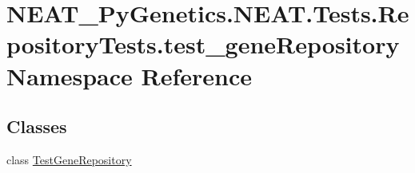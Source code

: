 \hypertarget{namespaceNEAT__PyGenetics_1_1NEAT_1_1Tests_1_1RepositoryTests_1_1test__geneRepository}{}\section{N\+E\+A\+T\+\_\+\+Py\+Genetics.\+N\+E\+A\+T.\+Tests.\+Repository\+Tests.\+test\+\_\+gene\+Repository Namespace Reference}
\label{namespaceNEAT__PyGenetics_1_1NEAT_1_1Tests_1_1RepositoryTests_1_1test__geneRepository}
\subsection*{Classes}
\begin{DoxyCompactItemize}
\item 
class \hyperlink{classNEAT__PyGenetics_1_1NEAT_1_1Tests_1_1RepositoryTests_1_1test__geneRepository_1_1TestGeneRepository}{Test\+Gene\+Repository}
\end{DoxyCompactItemize}
